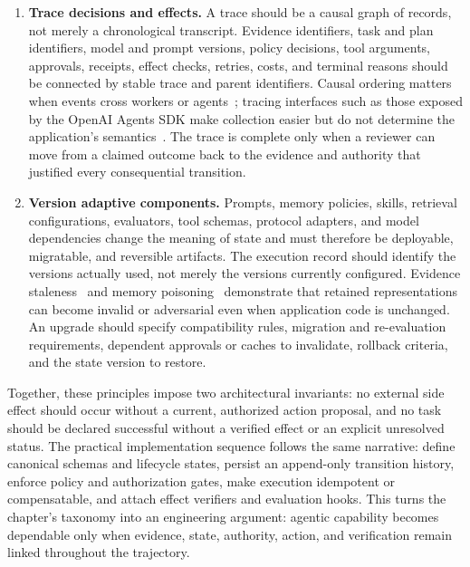 \begin{enumerate}
    \item \textbf{Trace decisions and effects.} A trace should be a causal graph of records, not merely a chronological transcript. Evidence identifiers, task and plan identifiers, model and prompt versions, policy decisions, tool arguments, approvals, receipts, effect checks, retries, costs, and terminal reasons should be connected by stable trace and parent identifiers. Causal ordering matters when events cross workers or agents~\cite{lamport1978timeclocks}; tracing interfaces such as those exposed by the OpenAI Agents SDK make collection easier but do not determine the application's semantics~\cite{openai2025agentssdk}. The trace is complete only when a reviewer can move from a claimed outcome back to the evidence and authority that justified every consequential transition.

    \item \textbf{Version adaptive components.} Prompts, memory policies, skills, retrieval configurations, evaluators, tool schemas, protocol adapters, and model dependencies change the meaning of state and must therefore be deployable, migratable, and reversible artifacts. The execution record should identify the versions actually used, not merely the versions currently configured. Evidence staleness~\cite{vu2023freshllms} and memory poisoning~\cite{dash2026memorypoisoning} demonstrate that retained representations can become invalid or adversarial even when application code is unchanged. An upgrade should specify compatibility rules, migration and re-evaluation requirements, dependent approvals or caches to invalidate, rollback criteria, and the state version to restore.
\end{enumerate}

Together, these principles impose two architectural invariants: no external side effect should occur without a current, authorized action proposal, and no task should be declared successful without a verified effect or an explicit unresolved status. The practical implementation sequence follows the same narrative: define canonical schemas and lifecycle states, persist an append-only transition history, enforce policy and authorization gates, make execution idempotent or compensatable, and attach effect verifiers and evaluation hooks. This turns the chapter's taxonomy into an engineering argument: agentic capability becomes dependable only when evidence, state, authority, action, and verification remain linked throughout the trajectory.
